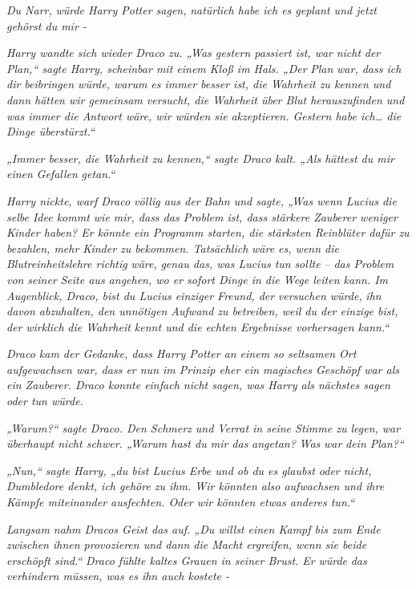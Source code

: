 {\emph{\emph{Du Narr,}} \emph{würde Harry Potter sagen,} \emph{\emph{natürlich habe ich es geplant und jetzt gehörst du mir -}}

\emph{Harry wandte sich wieder Draco zu. „Was gestern passiert ist, war} \emph{\emph{nicht}} \emph{der Plan,“ sagte Harry, scheinbar mit einem Kloß im Hals. „Der} \emph{\emph{Plan}} \emph{war, dass ich dir beibringen würde, warum es immer besser ist, die Wahrheit zu kennen und dann hätten wir gemeinsam versucht, die Wahrheit über Blut herauszufinden und was immer die Antwort wäre, wir würden sie} \emph{akzeptieren. Gestern habe ich… die Dinge überstürzt.“}

\emph{„Immer besser, die Wahrheit zu kennen,“ sagte Draco kalt. „Als hättest du mir einen} \emph{\emph{Gefallen}} \emph{getan.“}

\emph{Harry nickte, warf Draco völlig aus der Bahn und sagte, „Was wenn Lucius die selbe Idee kommt wie mir, dass das Problem ist, dass stärkere Zauberer weniger Kinder haben? Er könnte ein Programm starten, die stärksten Reinblüter dafür zu bezahlen, mehr Kinder zu bekommen. Tatsächlich} \emph{wäre es, wenn die Blutreinheitslehre richtig} \emph{\emph{wäre,}} \emph{genau das, was Lucius tun} \emph{\emph{sollte}} \emph{-- das Problem von} \emph{\emph{seiner}} \emph{Seite aus angehen, wo er sofort Dinge in die Wege leiten kann. Im Augenblick, Draco, bist du Lucius einziger Freund, der} \emph{versuchen würde,} \emph{ihn davon abzuhalten, den unnötigen Aufwand zu betreiben, weil du der einzige bist, der} \emph{\emph{wirklich}} \emph{die Wahrheit kennt und die echten Ergebnisse vorhersagen kann.“}

\emph{Draco kam der Gedanke, dass Harry Potter an einem so seltsamen Ort aufgewachsen war, dass er nun im Prinzip eher ein magisches Geschöpf war als ein Zauberer. Draco konnte einfach nicht sagen, was Harry als nächstes sagen oder tun würde.}

\emph{„\emph{Warum?}“ sagte Draco. Den Schmerz und Verrat in seine Stimme zu legen, war überhaupt nicht schwer. „Warum hast du mir das} \emph{\emph{angetan?}} \emph{Was} \emph{\emph{war}} \emph{dein Plan?“}

\emph{„Nun,“ sagte Harry, „du bist Lucius Erbe und ob du es glaubst oder nicht, Dumbledore denkt, ich gehöre zu ihm. Wir könnten also aufwachsen und ihre Kämpfe miteinander ausfechten. Oder wir könnten etwas anderes tun.“}

\emph{Langsam nahm Dracos Geist das auf. „Du willst einen Kampf bis zum Ende zwischen ihnen provozieren und dann die Macht ergreifen, wenn sie beide erschöpft sind.“} \emph{Draco fühlte kaltes Grauen in seiner Brust. Er} \emph{\emph{würde}} \emph{das verhindern müssen, was es ihn auch kostete -}

}
